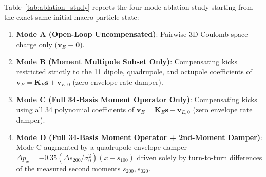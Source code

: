 \documentclass[11pt,a4paper]{article}
\begin{document}
Table~\ref{tab:ablation_study} reports the four-mode ablation study starting from the exact same initial macro-particle state:
\begin{enumerate}
    \item \textbf{Mode A (Open-Loop Uncompensated)}: Pairwise 3D Coulomb space-charge only ($\bm{v}_E \equiv \bm{0}$).
    \item \textbf{Mode B (Moment Multipole Subset Only)}: Compensating kicks restricted strictly to the 11 dipole, quadrupole, and octupole coefficients of $\bm{v}_E = \bm{K}_E\bm{s} + \bm{v}_{E,0}$ (zero envelope rate damper).
    \item \textbf{Mode C (Full 34-Basis Moment Operator Only)}: Compensating kicks using all 34 polynomial coefficients of $\bm{v}_E = \bm{K}_E\bm{s} + \bm{v}_{E,0}$ (zero envelope rate damper).
    \item \textbf{Mode D (Full 34-Basis Moment Operator + 2nd-Moment Damper)}: Mode C augmented by a quadrupole envelope damper $\Delta p_x = -0.35 (\Delta s_{200}/\sigma_0^2)(x - s_{100})$ driven solely by turn-to-turn differences of the measured second moments $s_{200}, s_{020}$.
\end{enumerate}

\begin{table}[htbp]
\centering
\caption{Four-Mode Ablation Study of Multi-Turn 3D Symplectic Pairwise-Coulomb Tracking ($N_{\mathrm{turns}}=80, N_p=500, \Delta Q_{\mathrm{sc,eff}}=-0.1817$, Identical Initial Conditions)}
\label{tab:ablation_study}
\end{table}
\end{document}
